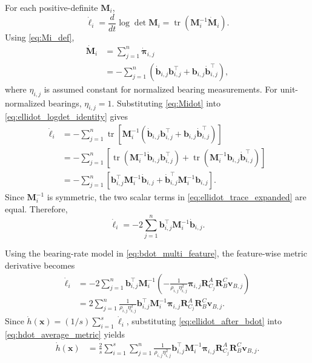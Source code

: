 \documentclass[journal]{IEEEtran}
\newcommand{\Tr}{\operatorname{tr}}
\begin{document}
For each positive-definite $\bm{M}_{i}$,
\begin{equation}
  \dot{\ell}_{i}
  = \frac{d}{dt}\log\det\bm{M}_{i}
  = \Tr\left(\bm{M}_{i}^{-1}\dot{\bm{M}}_{i}\right).
  \label{eq:ellidot_logdet_identity}
\end{equation}
Using \eqref{eq:Mi_def},
\begin{align}
  \dot{\bm{M}}_{i}
  &= \sum_{j=1}^{n}\dot{\bm{\pi}}_{i,j} \nonumber\\
  &= -\sum_{j=1}^{n}
  \left(\dot{\bm{b}}_{i,j}\bm{b}_{i,j}^{\top}
  + \bm{b}_{i,j}\dot{\bm{b}}_{i,j}^{\top}\right),
  \label{eq:Midot}
\end{align}
where $\eta_{i,j}$ is assumed constant for normalized bearing measurements. For unit-normalized bearings, $\eta_{i,j}=1$. Substituting \eqref{eq:Midot} into \eqref{eq:ellidot_logdet_identity} gives
\begin{align}
  \dot{\ell}_{i}
  &=
  -\sum_{j=1}^{n}
  \Tr\left[
  \bm{M}_{i}^{-1}
  \left(
  \dot{\bm{b}}_{i,j}\bm{b}_{i,j}^{\top}
  +
  \bm{b}_{i,j}\dot{\bm{b}}_{i,j}^{\top}
  \right)
  \right] \nonumber\\
  &=
  -\sum_{j=1}^{n}
  \left[
  \Tr\left(
  \bm{M}_{i}^{-1}\dot{\bm{b}}_{i,j}\bm{b}_{i,j}^{\top}
  \right)
  +
  \Tr\left(
  \bm{M}_{i}^{-1}\bm{b}_{i,j}\dot{\bm{b}}_{i,j}^{\top}
  \right)
  \right] \nonumber\\
  &=
  -\sum_{j=1}^{n}
  \left[
  \bm{b}_{i,j}^{\top}\bm{M}_{i}^{-1}\dot{\bm{b}}_{i,j}
  +
  \dot{\bm{b}}_{i,j}^{\top}\bm{M}_{i}^{-1}\bm{b}_{i,j}
  \right].
  \label{eq:ellidot_trace_expanded}
\end{align}
Since $\bm{M}_{i}^{-1}$ is symmetric, the two scalar terms in \eqref{eq:ellidot_trace_expanded} are equal. Therefore,
\begin{equation}
  \dot{\ell}_{i}
  = -2\sum_{j=1}^{n}
  \bm{b}_{i,j}^{\top}\bm{M}_{i}^{-1}\dot{\bm{b}}_{i,j}.
  \label{eq:ellidot_compact}
\end{equation}

Using the bearing-rate model in \eqref{eq:bdot_multi_feature}, the feature-wise metric derivative becomes
\begin{align}
  \dot{\ell}_{i}
  &=
  -2\sum_{j=1}^{n}
  \bm{b}_{i,j}^{\top}\bm{M}_{i}^{-1}
  \left(
  -\frac{1}{\rho_{i,j}\eta_{i,j}^{2}}
  \bm{\pi}_{i,j}\bm{R}_{C_j}^{A}\bm{R}_{B}^{C}\bm{v}_{B,j}
  \right) \nonumber\\
  &=
  2\sum_{j=1}^{n}
  \frac{1}{\rho_{i,j}\eta_{i,j}^{2}}
  \bm{b}_{i,j}^{\top}\bm{M}_{i}^{-1}\bm{\pi}_{i,j}
  \bm{R}_{C_j}^{A}\bm{R}_{B}^{C}\bm{v}_{B,j}.
  \label{eq:ellidot_after_bdot}
\end{align}
Since $\dot{h}(\bm{x}) = (1/s)\sum_{i=1}^{s}\dot{\ell}_{i}$, substituting \eqref{eq:ellidot_after_bdot} into \eqref{eq:hdot_average_metric} yields
\begin{align}
  \dot{h}(\bm{x})
  &= \frac{2}{s}\sum_{i=1}^{s}\sum_{j=1}^{n}
  \frac{1}{\rho_{i,j}\eta_{i,j}^{2}}
  \bm{b}_{i,j}^{\top}\bm{M}_{i}^{-1}\bm{\pi}_{i,j}
  \bm{R}_{C_j}^{A}\bm{R}_{B}^{C}\bm{v}_{B,j}.
  \label{eq:hdot_average_expanded}
\end{align}
\end{document}
